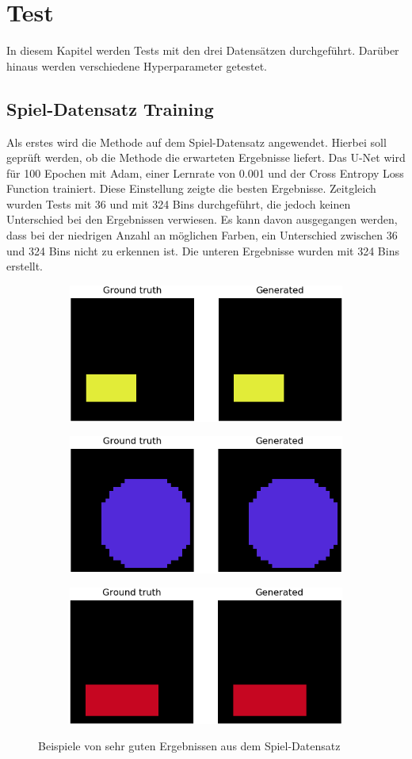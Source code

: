 \chapter{Test}
In diesem Kapitel werden Tests mit den drei Datensätzen durchgeführt. Darüber hinaus werden verschiedene Hyperparameter getestet.

\section{Spiel-Datensatz Training}
\label{experimente:spiel}
Als erstes wird die Methode auf dem Spiel-Datensatz angewendet. Hierbei soll geprüft werden, ob die Methode die erwarteten
Ergebnisse liefert. Das U-Net wird für 100 Epochen mit Adam, einer Lernrate von 0.001 und der Cross Entropy Loss Function trainiert. Diese
Einstellung zeigte die besten Ergebnisse. Zeitgleich wurden Tests mit 36 und mit 324 Bins durchgeführt, die jedoch keinen Unterschied bei den 
Ergebnissen verwiesen. Es kann davon ausgegangen werden, dass bei der niedrigen Anzahl an möglichen Farben, ein Unterschied zwischen 36 und 324 Bins
nicht zu erkennen ist. Die unteren Ergebnisse wurden mit 324 Bins erstellt.

\begin{figure}[H]
  \vspace{1cm}
  \begin{subfigure}
    \centering
    \includegraphics[width=.32\textwidth]{resources/experiments/30.png}
  \end{subfigure}
  \begin{subfigure}
    \centering
    \includegraphics[width=.32\textwidth]{resources/experiments/31.png}
  \end{subfigure}
  \begin{subfigure}
    \centering
    \includegraphics[width=.32\textwidth]{resources/experiments/42.png}
  \end{subfigure}
  \caption{Beispiele von sehr guten Ergebnissen aus dem Spiel-Datensatz}
  \label{image:gute-ergebnisse-toy-dataset}
\end{figure}

